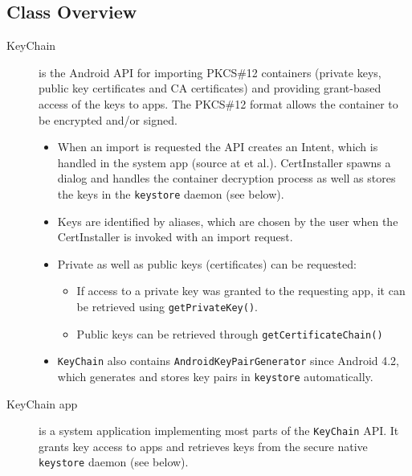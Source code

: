 \documentclass[a4paper,draft]{scrartcl}
\begin{document}
	\subsection{Class Overview}
		\begin{description}
			\item[KeyChain] is the Android API for importing PKCS\#12 containers (private keys, public key certificates and CA certificates) and providing grant-based access of the keys to apps. The PKCS\#12 format allows the container to be encrypted and/or signed.
				\begin{itemize}
					\item When an import is requested the API creates an Intent, which is handled in the system app  (source at  et al.). CertInstaller spawns a dialog and handles the container decryption process as well as stores the keys in the \texttt{keystore} daemon (see below).
					\item Keys are identified by aliases, which are chosen by the user when the CertInstaller is invoked with an import request.
					\item Private as well as public keys (certificates) can be requested:
					\begin{itemize}
						\item If access to a private key was granted to the requesting app, it can be retrieved using \texttt{getPrivateKey()}.
						\item Public keys can be retrieved through \texttt{getCertificateChain()}
					\end{itemize}
				\item \texttt{KeyChain} also contains \texttt{AndroidKeyPairGenerator} since Android 4.2, which generates and stores key pairs in \texttt{key\-store} automatically.
				\end{itemize}

			\item[KeyChain app] is a system application implementing most parts of the \texttt{KeyChain} API. It grants key access to apps and retrieves keys from the secure native \texttt{keystore} daemon (see below).


\end{description}
\end{document}
